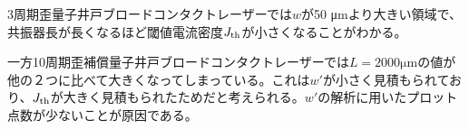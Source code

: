 3周期歪量子井戸ブロードコンタクトレーザーでは$w$が50 \si{\micro\metre}より大きい領域で、共振器長が長くなるほど閾値電流密度$J_{\rm{th}}$が小さくなることがわかる。

一方10周期歪補償量子井戸ブロードコンタクトレーザーでは$L=2000 \si{\micro\metre}$の値が他の２つに比べて大きくなってしまっている。これは$w'$が小さく見積もられており、$J_{\rm{th}}$が大きく見積もられたためだと考えられる。$w'$の解析に用いたプロット点数が少ないことが原因である。

\clearpage
\clearpage
